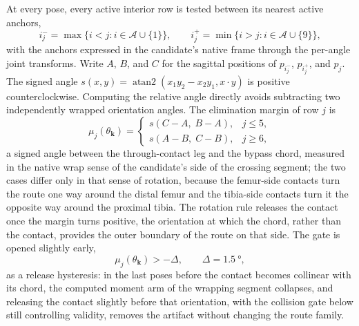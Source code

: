 At every pose, every active interior row is tested between its nearest active anchors,
\begin{equation}
i^{-}_{j} = \max\{i < j : i \in \mathcal{A} \cup \{1\}\}, \qquad
i^{+}_{j} = \min\{i > j : i \in \mathcal{A} \cup \{9\}\},
\label{eq:app_anchors}
\end{equation}
with the anchors expressed in the candidate's native frame through the per-angle joint transforms. Write $A$, $B$, and $C$ for the sagittal positions of $p_{i^{-}_{j}}$, $p_{i^{+}_{j}}$, and $p_{j}$. The signed angle $s(x,y)=\operatorname{atan2}(x_1y_2-x_2y_1,x\cdot y)$ is positive counterclockwise. Computing the relative angle directly avoids subtracting two independently wrapped orientation angles. The elimination margin of row $j$ is
\begin{equation}
\mu_{j}(\theta_{\mathbf{k}}) =
\begin{cases}
s\!\left(C - A,\; B - A\right), & j \leq 5,\\[4pt]
s\!\left(A - B,\; C - B\right), & j \geq 6,
\end{cases}
\label{eq:app_elim_margin}
\end{equation}
a signed angle between the through-contact leg and the bypass chord, measured in the native wrap sense of the candidate's side of the crossing segment; the two cases differ only in that sense of rotation, because the femur-side contacts turn the route one way around the distal femur and the tibia-side contacts turn it the opposite way around the proximal tibia. The rotation rule releases the contact once the margin turns positive, the orientation at which the chord, rather than the contact, provides the outer boundary of the route on that side. The gate is opened slightly early,
\begin{equation}
\mu_{j}(\theta_{\mathbf{k}}) > -\Delta, \qquad \Delta = \qty{1.5}{\degree},
\label{eq:app_rotation_gate}
\end{equation}
as a release hysteresis: in the last poses before the contact becomes collinear with its chord, the computed moment arm of the wrapping segment collapses, and releasing the contact slightly before that orientation, with the collision gate below still controlling validity, removes the artifact without changing the route family.

